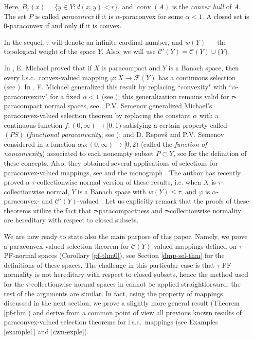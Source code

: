 \documentclass[12pt,a4paper,fleqn,leqno]{amsart}
\theoremstyle{plain}
\theoremstyle{definition}
\numberwithin{equation}{section}
\begin{document}
Here, $B_r(x)=\{y\in Y:d(x,y)<r\}$, and $\operatorname{conv}(A)$ is the \emph{convex hull} of $A$. The set $P$ is called \emph{paraconvex} if it is $\alpha$-paraconvex for some $\alpha<1$. A closed set is $0$-paraconvex if and only if it is convex.\medskip

In the sequel, $\tau$ will denote an infinite cardinal number, and $w(Y)$ --- the topological weight of the space $Y$. Also, we will use $\mathscr{C}'(Y)=\mathscr{C}(Y)\cup\{Y\}$. \medskip

In \cite{michael}, E. Michael proved that if $X$ is paracompact and $Y$ is a Banach space, then every l.s.c.\ convex-valued mapping $\varphi:X\to\mathscr{F}(Y)$ has a continuous selection (see \cite[Theorem $3.2^{\prime\prime}$]{michael}). In \cite{michael2}, E. Michael generalized this result by replacing ``convexity" with ``$\alpha$-paraconvexity" for a fixed $\alpha<1$ (see \cite[Theorem 2.1]{michael2}); this generalization remains valid for $\tau$-paracompact normal spaces, see \cite[Theorem 3.2]{loufouma}. P.V. Semenov generalized Michael's paraconvex-valued selection theorem by replacing the constant $\alpha$ with a continuous function $f:(0,\infty)\to[0,1)$ satisfying a certain property called $(PS)$ (\emph{functional paraconvexity}, see \cite{semenov}); and D. Repov\v{s} and P.V. Semenov considered in \cite{repov-semenov} a function $\alpha_P:(0,\infty)\to[0,2)$ (called the \emph{function of nonconvexity}) associated to each nonempty subset $P\subset Y$, see \cite{repov-semenov,semenov} for the definition of these concepts. Also, they obtained several applications of selections for paraconvex-valued mappings, see \cite{repov-semenov2,repov-semenov3,repov-semenov4,repov-semenov5,repov-semenov6,semenov2}
and the monograph \cite{repov-semenov7}. The author has recently proved a $\tau$-collectionwise normal version of these results, i.e. when $X$ is $\tau$-collectionwise normal, $Y$ is a Banach space with $w(Y)\leq\tau$, and $\varphi$ is $\alpha$-paraconvex- and $\mathscr{C}'(Y)$-valued \cite[Theorem 2.1]{loufouma}. Let us explicitly remark that the proofs of these theorems utilize the fact that $\tau$-paracompactness and $\tau$-collectionwise normality are hereditary with respect to closed subsets.\medskip

We are now ready to state also the main purpose of this paper. Namely, we prove a paraconvex-valued selection theorem for $\mathscr{C}(Y)$-valued mappings defined on $\tau$-PF-normal spaces (Corollary \ref{pf-thm0}), see Section \ref{dmp-sel-thm} for the definitions of these spaces. The challenge in this particular case is that $\tau$-PF-normality is not hereditary with respect to closed subsets, hence the method used for the $\tau$-collectionwise normal spaces in \cite{loufouma} cannot be applied straightforward; the rest of the arguments are similar. In fact, using the property of mappings discussed in the next section, we prove a slightly more general result (Theorem \ref{pf-thm}) and derive from a common point of view all previous known results of paraconvex-valued selection theorems for l.s.c.\ mappings (see Examples \ref{example1} and \ref{cwn-exple}).
\end{document}
